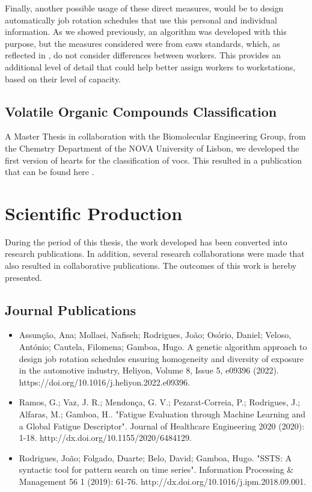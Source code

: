\par
Finally, another possible usage of these direct measures, would be to design automatically job rotation schedules that use this personal and individual information. As we showed previously, an algorithm was developed with this purpose, but the measures considered were from \gls{eaws} standards, which, as reflected in \cite{sara}, do not consider differences between workers. This provides an additional level of detail that could help better assign workers to workstations, based on their level of capacity.

\subsection{Volatile Organic Compounds Classification}

A Master Thesis in collaboration with the Biomolecular Engineering Group, from the Chemstry Department of the NOVA University of Lisbon, we developed the first version of \gls{hearts} for the classification of \gls{voc}s. This resulted in a publication that can be found here \cite{class_voc}.

\section{Scientific Production}

During the period of this thesis, the work developed has been converted into research publications. In addition, several research collaborations were made that also resulted in collaborative publications. The outcomes of this work is hereby presented.

\subsection{Journal Publications}

\begin{itemize}
\item Assunção, Ana; Mollaei, Nafiseh; Rodrigues, João; Osório, Daniel; Veloso, António; Cautela, Filomena; Gamboa, Hugo. A genetic algorithm approach to design job rotation schedules ensuring homogeneity and diversity of exposure in the automotive industry, Heliyon, Volume 8, Issue 5, e09396 (2022). https://doi.org/10.1016/j.heliyon.2022.e09396.

\item Ramos, G.; Vaz, J. R.; Mendonça, G. V.; Pezarat-Correia, P.; Rodrigues, J.; Alfaras, M.; Gamboa, H.. "Fatigue Evaluation through Machine Learning and a Global Fatigue Descriptor". Journal of Healthcare Engineering 2020 (2020): 1-18. http://dx.doi.org/10.1155/2020/6484129.

\item Rodrigues, João; Folgado, Duarte; Belo, David; Gamboa, Hugo. "SSTS: A syntactic tool for pattern search on time series". Information Processing & Management 56 1 (2019): 61-76. http://dx.doi.org/10.1016/j.ipm.2018.09.001.
\end{itemize}

